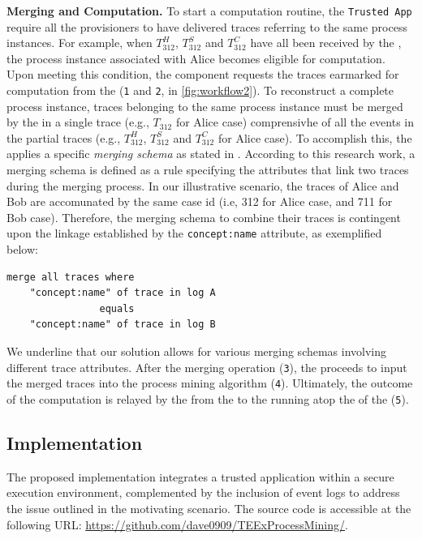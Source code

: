\textbf{Merging and Computation.} To start a computation routine, the \texttt{Trusted App} require all the provisioners to have delivered traces referring to the same process instances. For example, when $T^H_{312}$, $T^S_{312}$ and $T^C_{312}$ %
have all been received by the , the process instance associated with Alice becomes eligible for computation.
Upon meeting this condition, the  component requests the traces earmarked for computation from the  (\texttt{1} and \texttt{2}, in \cref{fig:workflow2}). To reconstruct a complete process instance, traces belonging to the same process instance must be merged by the  in a single trace (e.g., $T_{312}$ for Alice case) comprensivhe of all the events in the partial traces (e.g., $T^H_{312}$, $T^S_{312}$ and $T^C_{312}$ for Alice case). To accomplish this, the  applies a specific \textit{merging schema} as stated in \cite{claes2014merging}. According to this research work, a merging schema is defined as a rule specifying the attributes that link two traces during the merging process. In our illustrative scenario, the traces of Alice and Bob are accomunated by the same case id (i.e, 312 for Alice case, and 711 for Bob case). Therefore, the merging schema to combine their traces is contingent upon the linkage established by the \texttt{concept:name} attribute, as exemplified below:
\vspace{-1em}
\begin{lstlisting}[numbers=none]
merge all traces where
	"concept:name" of trace in log A
				equals
	"concept:name" of trace in log B
\end{lstlisting}
We underline that our solution allows for various merging schemas involving different trace attributes. After the merging operation (\texttt{3}), the  proceeds to input the merged traces into the process mining algorithm (\texttt{4}). Ultimately, the outcome of the computation is relayed by the  from the  to the  running atop the  of the  (\texttt{5}).
 









\subsection{Implementation}
\label{sec:implementation:details}
The proposed implementation integrates a trusted application within a secure execution environment, complemented by the inclusion of event logs to address the issue outlined in the motivating scenario. The source code is accessible at the following URL: \url{https://github.com/dave0909/TEExProcessMining/}. 

